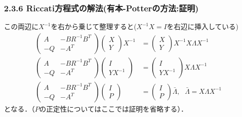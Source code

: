 \begin{frame}[t]
\frametitle{2.3.6 Riccati方程式の解法(有本-Potterの方法:証明)}
この両辺に$X^{-1}$を右から乗じて整理すると($X^{-1}X =I$を右辺に挿入している)
\begin{align}
	\left(\begin{array}{cc}
	       A  & - B R^{-1} B^T \\
	       -Q & - A^T
	\end{array}\right)
		 \left(\begin{array}{c}
		      X \\
		      Y
		\end{array}\right)
		X^{-1}
	&= 
		 \left(\begin{array}{cccc}
		      X \\
		      Y
		\end{array}\right)
		X^{-1} X \Lambda
		X^{-1}
\nonumber \\
	\left(\begin{array}{cc}
	       A  & - B R^{-1} B^T \\
	       -Q & - A^T
	\end{array}\right)
		 \left(\begin{array}{c}
		      I \\
		      YX^{-1}
		\end{array}\right)
	&= 
		 \left(\begin{array}{cccc}
		      I \\
		      YX^{-1}
		\end{array}\right)
		X \Lambda
		X^{-1}
\nonumber \\
	\left(\begin{array}{cc}
	       A  & - B R^{-1} B^T \\
	       -Q & - A^T
	\end{array}\right)
		 \left(\begin{array}{c}
		      I \\
		      P
		\end{array}\right)
	&= 
		 \left(\begin{array}{cccc}
		      I \\
		      P
		\end{array}\right)
		\bar{\Lambda}
		, \ \ \ 
		\bar{\Lambda} = X \Lambda X^{-1}
\end{align}
となる．（$P$の正定性についてはここでは証明を省略する）．
\end{frame}

